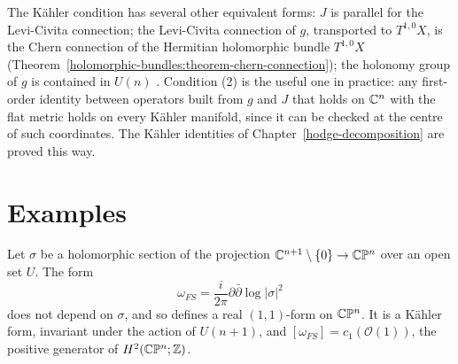 \begin{remark}\label{kahler:remark-levi-civita}
The K\"ahler condition has several other equivalent forms: $J$ is parallel for the Levi-Civita connection; the Levi-Civita connection of $g$,
transported to $T^{1,0}X$, is the Chern connection of the Hermitian holomorphic bundle $T^{1,0}X$
(Theorem~\ref{holomorphic-bundles:theorem-chern-connection}); the holonomy group of $g$ is contained in $U(n)$ \cite[Chapter 4]{huybrechts-complex}.
Condition (2) is the useful one in practice: any first-order identity between operators built from $g$ and $J$ that holds on $\mathbb{C}^n$ with
the flat metric holds on every K\"ahler manifold, since it can be checked at the centre of such coordinates. The K\"ahler identities of
Chapter~\ref{hodge-decomposition} are proved this way.
\end{remark}

\section{Examples}\label{kahler:section-examples}

\begin{proposition}\label{kahler:proposition-fubini-study}
Let $\sigma$ be a holomorphic section of the projection $\mathbb{C}^{n+1} \setminus \{0\} \to \mathbb{C}\mathbb{P}^n$ over an open set $U$. The form
\[
\omega_{FS} = \frac{i}{2\pi}\partial\bar\partial\log|\sigma|^2
\]
does not depend on $\sigma$, and so defines a real $(1,1)$-form on $\mathbb{C}\mathbb{P}^n$. It is a K\"ahler form, invariant under the action of
$U(n+1)$, and $[\omega_{FS}] = c_1(\mathcal{O}(1))$, the positive generator of $H^2(\mathbb{C}\mathbb{P}^n; \mathbb{Z})$.
\end{proposition}

